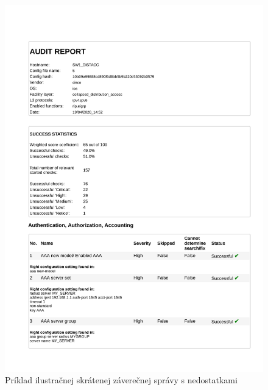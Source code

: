 \begin{figure}[H]
	\caption[Príklad ilustračnej skrátenej záverečnej správy s nedostatkami]{Príklad ilustračnej skrátenej záverečnej správy s nedostatkami}
	\begin{center}
		\includegraphics[scale=0.85]{obrazky/report_html_page_1.pdf}
	\end{center}
	
	\label{report_1}
\end{figure}
